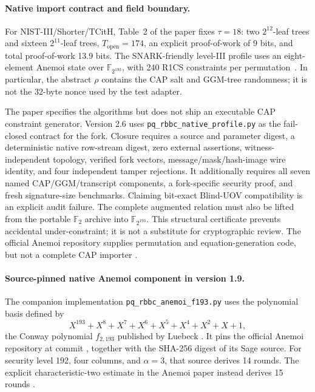 \documentclass[11pt]{article}
\begin{document}
\paragraph{Native import contract and field boundary.}
For NIST-III/Shorter/TCitH, Table~2 of the paper fixes
$\tau=18$: two $2^{12}$-leaf trees and sixteen $2^{11}$-leaf trees,
$T_{\mathrm{open}}=174$, an explicit proof-of-work of 9 bits, and total
proof-of-work 13.9 bits.  The SNARK-friendly level-III profile uses an
eight-element Anemoi state over $\mathbb F_{2^{193}}$, with 240 R1CS
constraints per permutation~\cite{blind-uov}.  In particular, the abstract
$\rho$ contains the CAP salt and GGM-tree randomness; it is not the 32-byte
nonce used by the test adapter.

The paper specifies the algorithms but does not ship an executable CAP
constraint generator.  Version 2.6 uses
\texttt{pq\_rbbc\_native\_profile.py} as the fail-closed contract for the fork.
Closure requires a source and parameter digest, a deterministic native
row-stream digest, zero external assertions, witness-independent topology,
verified fork vectors, message/mask/hash-image wire identity, and four
independent tamper rejections.  It additionally requires all seven named
CAP/GGM/transcript components, a fork-specific security proof, and fresh
signature-size benchmarks.  Claiming bit-exact Blind-UOV compatibility is an
explicit audit failure.  The complete augmented relation must also be lifted
from the portable $\mathbb F_2$ archive into $\mathbb F_{2^{193}}$.  This
structural certificate prevents accidental under-constraint; it is not a
substitute for cryptographic review.  The official Anemoi repository supplies
permutation and equation-generation code, but not a complete CAP importer
\cite{anemoi-code}.

\paragraph{Source-pinned native Anemoi component in version 1.9.}
The companion implementation
\texttt{pq\_rbbc\_anemoi\_f193.py} uses the polynomial basis defined by
\[
 X^{193}+X^8+X^7+X^6+X^5+X^4+X^2+X+1,
\]
the Conway polynomial $f_{2,193}$ published by Luebeck
\cite{conway-polynomials}.  It pins the official Anemoi repository at commit
, together with the SHA-256
digest of its Sage source.  For security level 192,
four columns, and $\alpha=3$, that source derives 14 rounds.  The explicit
characteristic-two estimate in the Anemoi paper instead derives 15 rounds
\cite{anemoi-paper}.
\end{document}
